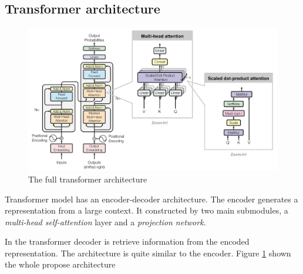 \subsection{Transformer architecture}

\begin{figure}[h]
    \centering
    \includegraphics[width=\textwidth]{content/resources/new_images/background/transformer.png}
    \caption{The full transformer architecture \cite{vaswani2017attention}}
    \label{fig:transformer_arch}
\end{figure}


Transformer model has an encoder-decoder architecture. The encoder generates a representation from a large context. It constructed by two main submodules, a \textit{multi-head self-attention} layer and a \textit{projection network}. 

In the transformer decoder is retrieve information from the encoded representation. The architecture is quite similar to the encoder. Figure \ref{fig:transformer_arch} shown the whole propose architecture
